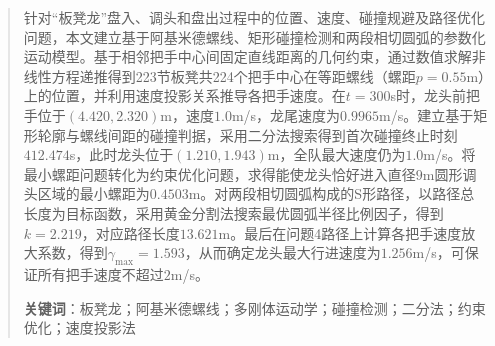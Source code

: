 \begin{abstract}

针对“板凳龙”盘入、调头和盘出过程中的位置、速度、碰撞规避及路径优化问题，本文建立基于阿基米德螺线、矩形碰撞检测和两段相切圆弧的参数化运动模型。基于相邻把手中心间固定直线距离的几何约束，通过数值求解非线性方程递推得到223节板凳共224个把手中心在等距螺线（螺距$p=0.55$m）上的位置，并利用速度投影关系推导各把手速度。在$t=300$s时，龙头前把手位于$(4.420,2.320)$m，速度$1.0$m/s，龙尾速度为$0.9965$m/s。建立基于矩形轮廓与螺线间距的碰撞判据，采用二分法搜索得到首次碰撞终止时刻$412.474$s，此时龙头位于$(1.210,1.943)$m，全队最大速度仍为$1.0$m/s。将最小螺距问题转化为约束优化问题，求得能使龙头恰好进入直径$9$m圆形调头区域的最小螺距为$0.4503$m。对两段相切圆弧构成的S形路径，以路径总长度为目标函数，采用黄金分割法搜索最优圆弧半径比例因子，得到$k=2.219$，对应路径长度$13.621$m。最后在问题4路径上计算各把手速度放大系数，得到$\gamma_{\max}=1.593$，从而确定龙头最大行进速度为$1.256$m/s，可保证所有把手速度不超过$2$m/s。

\vspace{0.5em}
\noindent\textbf{关键词}：板凳龙；阿基米德螺线；多刚体运动学；碰撞检测；二分法；约束优化；速度投影法
\end{abstract}
